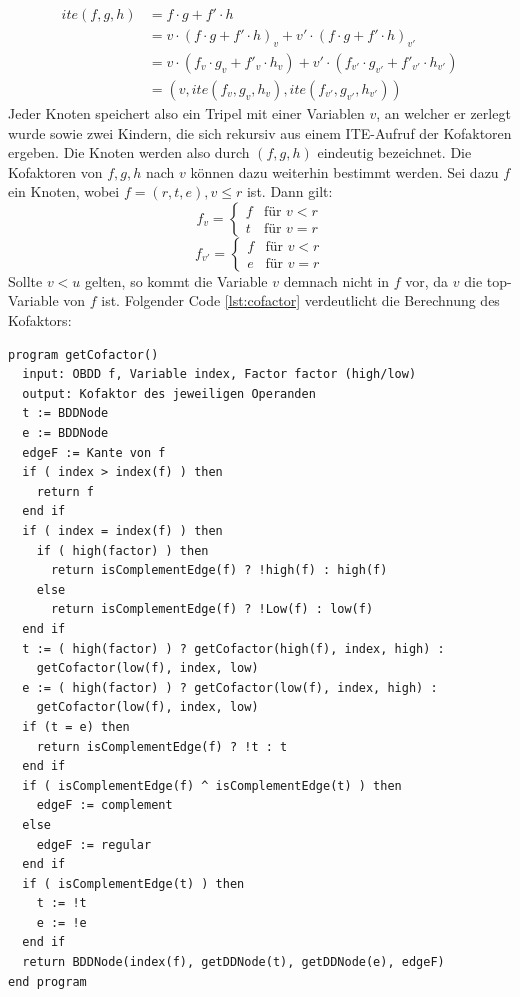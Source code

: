 \begin{equation*}
	\begin{split}
		ite(f, g, h) &= f \cdot g + f' \cdot h \\
		&= v \cdot (f \cdot g + f' \cdot h)_v + v' \cdot (f \cdot g + f' \cdot h)_{v'}\\
		&= v \cdot (f_v \cdot g_v + f'_v \cdot h_v) + v' \cdot (f_{v'} \cdot g_{v'} + f'_{v'} \cdot h_{v'})\\
		&= (v, ite(f_v, g_v, h_v), ite(f_{v'}, g_{v'}, h_{v'}))
	\end{split}
\end{equation*}
Jeder Knoten speichert also ein Tripel mit einer Variablen $v$, an welcher er zerlegt wurde sowie zwei \glqq Kindern\grqq{}, die sich rekursiv aus einem ITE-Aufruf der Kofaktoren ergeben. Die Knoten werden also durch $(f, g, h)$ eindeutig bezeichnet. Die Kofaktoren von $f, g, h$ nach $v$ können dazu weiterhin bestimmt werden. Sei dazu $f$ ein Knoten, wobei $f = (r, t, e), v \leq r$ ist. Dann gilt:\\
\begin{equation*} 
f_v = \begin{cases} 
f & \text{für } v < r \\ 
t & \text{für } v = r
\end{cases} 
\end{equation*}
\begin{equation*}
f_{v'} = \begin{cases} 
f & \text{für } v < r \\ 
e & \text{für } v = r
\end{cases} 
\end{equation*}
Sollte $v < u$ gelten, so kommt die Variable $v$ demnach nicht in $f$ vor, da $v$ die top-Variable von $f$ ist. Folgender Code \ref{lst:cofactor} verdeutlicht die Berechnung des Kofaktors:
\lstset{language=xml}
\begin{lstlisting}[frame=htrbl, caption={Implementierung von {\ttfamily getCofactor}}, label={lst:cofactor}]
program getCofactor()
  input: OBDD f, Variable index, Factor factor (high/low)
  output: Kofaktor des jeweiligen Operanden
  t := BDDNode
  e := BDDNode
  edgeF := Kante von f
  if ( index > index(f) ) then
    return f
  end if
  if ( index = index(f) ) then
    if ( high(factor) ) then
      return isComplementEdge(f) ? !high(f) : high(f)
    else 
      return isComplementEdge(f) ? !Low(f) : low(f)
  end if
  t := ( high(factor) ) ? getCofactor(high(f), index, high) :
    getCofactor(low(f), index, low)
  e := ( high(factor) ) ? getCofactor(low(f), index, high) : 
    getCofactor(low(f), index, low)
  if (t = e) then
    return isComplementEdge(f) ? !t : t
  end if
  if ( isComplementEdge(f) ^ isComplementEdge(t) ) then
    edgeF := complement
  else
    edgeF := regular
  end if
  if ( isComplementEdge(t) ) then
    t := !t
    e := !e
  end if
  return BDDNode(index(f), getDDNode(t), getDDNode(e), edgeF)
end program
\end{lstlisting}
